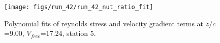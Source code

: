 \begin{figure}[H]
\centering
\texttt{[image: figs/run\_42/run\_42\_nut\_ratio\_fit]}
\caption{Polynomial fits of reynolds stress and velocity gradient terms at $z/c$=9.00, $V_{free}$=17.24, station 5.}
\label{fig:run_42_nut_ratio_fit}
\end{figure}


